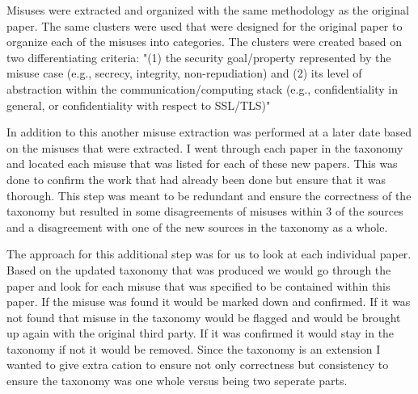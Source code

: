 Misuses were extracted and organized with the same methodology as the original paper. The same clusters were used that were designed for the original paper to organize each of the misuses into categories. The clusters were created based on two differentiating criteria: "(1) the security goal/property represented by the misuse case  (e.g., secrecy, integrity, non-repudiation) and (2) its level of abstraction within the communication/computing stack (e.g., confidentiality in general, or confidentiality with respect to SSL/TLS)"
    
In addition to this another misuse extraction was performed at a later date based on the misuses that were extracted. I went through each paper in the taxonomy and located each misuse that was listed for each of these new papers. This was done to confirm the work that had already been done but ensure that it was thorough. This step was meant to be redundant and ensure the correctness of the taxonomy but resulted in some disagreements of misuses within 3 of the sources and a disagreement with one of the new sources in the taxonomy as a whole. 

The approach for this additional step was for us to look at each individual paper. Based on the updated taxonomy that was produced we would go through the paper and look for each misuse that was specified to be contained within this paper. If the misuse was found it would be marked down and confirmed. If it was not found that misuse in the taxonomy would be flagged and would be brought up again with the original third party. If it was confirmed it would stay in the taxonomy if not it would be removed. Since the taxonomy is an extension I wanted to give extra cation to ensure not only correctness but consistency to ensure the taxonomy was one whole versus being two seperate parts.
  
